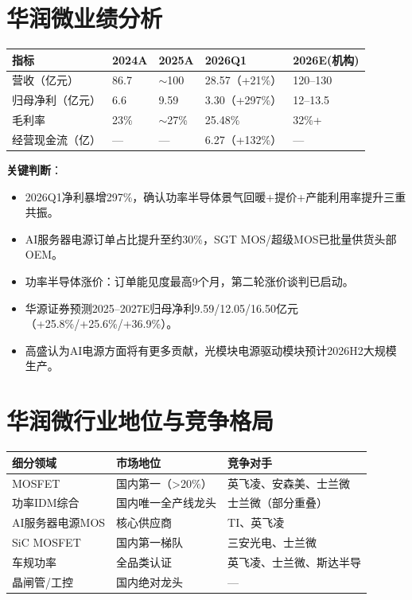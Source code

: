 \documentclass[a4paper,11pt,fontset=none]{ctexart}
\begin{document}
\section{华润微业绩分析}

\begin{exhibitbox}
\begin{tabularx}{\textwidth}{L{3.2cm}XXXX}
\toprule
\textbf{指标} & \textbf{2024A} & \textbf{2025A} & \textbf{2026Q1} & \textbf{2026E(机构)} \\
\midrule
营收（亿元） & 86.7 & $\sim$100 & 28.57（+21\%） & 120--130 \\
归母净利（亿元） & 6.6 & 9.59 & 3.30（+297\%） & 12--13.5 \\
毛利率 & 23\% & $\sim$27\% & 25.48\% & 32\%+ \\
经营现金流（亿） & --- & --- & 6.27（+132\%） & --- \\
\bottomrule
\end{tabularx}
\end{exhibitbox}

\textbf{关键判断}：
\begin{itemize}
  \item 2026Q1净利暴增297\%，确认功率半导体景气回暖+提价+产能利用率提升三重共振。
  \item AI服务器电源订单占比提升至约30\%，SGT MOS/超级MOS已批量供货头部OEM。
  \item 功率半导体涨价：订单能见度最高9个月，第二轮涨价谈判已启动。
  \item 华源证券预测2025--2027E归母净利9.59/12.05/16.50亿元（+25.8\%/+25.6\%/+36.9\%）。
  \item 高盛认为AI电源方面将有更多贡献，光模块电源驱动模块预计2026H2大规模生产。
\end{itemize}

\section{华润微行业地位与竞争格局}

\begin{tabularx}{\textwidth}{L{3cm}L{3cm}X}
\toprule
\textbf{细分领域} & \textbf{市场地位} & \textbf{竞争对手} \\
\midrule
MOSFET & 国内第一（>20\%） & 英飞凌、安森美、士兰微 \\
功率IDM综合 & 国内唯一全产线龙头 & 士兰微（部分重叠） \\
AI服务器电源MOS & 核心供应商 & TI、英飞凌 \\
SiC MOSFET & 国内第一梯队 & 三安光电、士兰微 \\
车规功率 & 全品类认证 & 英飞凌、士兰微、斯达半导 \\
晶闸管/工控 & 国内绝对龙头 & --- \\
\bottomrule
\end{tabularx}
\end{document}
